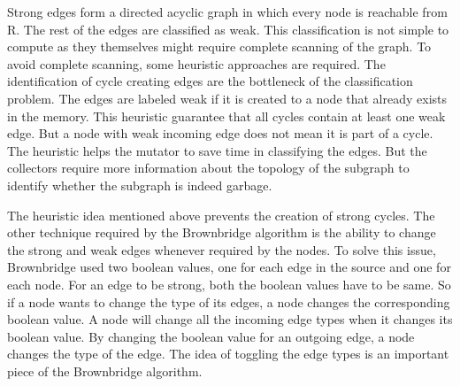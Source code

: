 Strong edges form a directed acyclic graph in which every node is reachable from R. The rest of the edges are classified as weak. This classification is not simple to compute as they themselves might require complete scanning of the graph. To avoid complete scanning, some heuristic approaches are required. The identification of cycle creating edges are the bottleneck of the classification problem. The edges are  labeled weak if it is created to a node that already exists in the memory. This heuristic guarantee that all cycles contain at least one weak edge. But a node with weak incoming edge does not mean it is part of a cycle. The heuristic helps the mutator to save time in classifying the edges. But the collectors require more information about the topology of the subgraph to identify whether the subgraph is indeed garbage. 

The heuristic idea mentioned above prevents the creation of strong cycles. The other technique required by the Brownbridge algorithm is the ability to change the strong and weak edges whenever required by the nodes. To solve this issue, Brownbridge used two boolean values, one for each edge in the source and one for each node. For an edge to be strong, both the boolean values have to be same. So if a node wants to change the type of its edges, a node changes the corresponding boolean value. A node will change all the incoming edge types when it changes its boolean value. By changing the boolean value for an outgoing edge, a node changes the type of the edge. The idea of toggling the edge types is an important piece of the Brownbridge algorithm.

